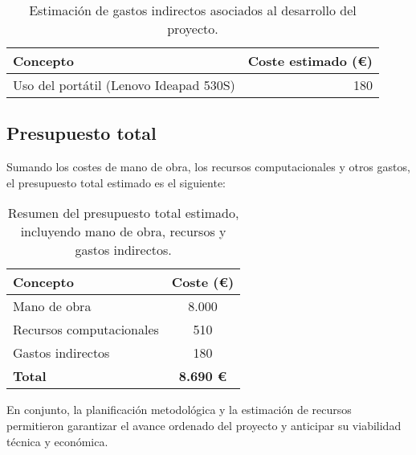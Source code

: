 \begin{table}[htp]
    \centering
    \begin{tabular}{|l|r|}
        \hline
        \textbf{Concepto}                      & \textbf{Coste estimado (€)} \\ \hline
        Uso del portátil (Lenovo Ideapad 530S) & 180                         \\ \hline
    \end{tabular}
    \caption{Estimación de gastos indirectos asociados al desarrollo del proyecto.}
    \label{tab:gastos-indirectos}
\end{table}


\subsection{Presupuesto total}\label{subsec:presupuesto-total}
Sumando los costes de mano de obra, los recursos computacionales y otros gastos, el presupuesto total estimado es el
siguiente:

\begin{table}[htp]
    \centering
    \begin{tabular}{|l|c|}
        \hline
        \textbf{Concepto}        & \textbf{Coste (€)} \\ \hline
        Mano de obra             & 8.000              \\
        Recursos computacionales & 510                \\
        Gastos indirectos        & 180                \\ \hline
        \textbf{Total}           & \textbf{8.690 €}   \\ \hline
    \end{tabular}
    \caption{Resumen del presupuesto total estimado, incluyendo mano de obra, recursos y gastos indirectos.}
    \label{tab:presupuesto-total}
\end{table}

En conjunto, la planificación metodológica y la estimación de recursos permitieron garantizar el avance
ordenado del proyecto y anticipar su viabilidad técnica y económica.